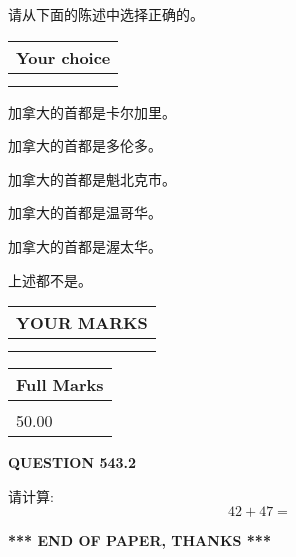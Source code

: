 \documentclass{ctexart}
\begin{document}
  
请从下面的陈述中选择正确的。
  
  
\noindent\hspace{3.0in} \begin{tabular}{|l|}
\hline
Your choice \\
\hline
 \\ 
 \\ 
\hline
\end{tabular}
  
  
 
 
加拿大的首都是卡尔加里。
 
 
加拿大的首都是多伦多。
 
 
加拿大的首都是魁北克市。
 
 
加拿大的首都是温哥华。
 
 
加拿大的首都是渥太华。
 
 
 上述都不是。
 
 
  
\vspace{0.2in}
  
\noindent\begin{tabular}{|l|}
\hline
 YOUR MARKS  \\
\hline
 \\ 
 \\ 
\hline
\end{tabular}
\hspace{0.05in} \begin{tabular}{|l|}
\hline
 Full Marks  \\
\hline
 \\ 
50.00 \\
\hline
\end{tabular}
{\textbf{\Large{QUESTION
543.2 
}}}
  
  
 
请计算:
\begin{equation}
42 +  %
47 = \nonumber
\end{equation}
 

 

 
   
   
 \vspace{0.2in}
 
   
   
   
   
\vspace{1.0in} 
{\textbf{\large{ *** END OF PAPER, THANKS *** }}} 
   
\end{document}
